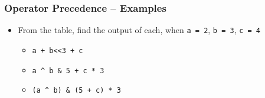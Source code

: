 \documentclass[11pt]{beamer}
\begin{document}
\begin{frame}[fragile]\frametitle{Operator Precedence -- Examples}
\label{sec-1-24}

\begin{itemize}
\item From the table, find the output of each, when \verb~a = 2~, \verb~b = 3~, \verb~c = 4~
\begin{itemize}
\item \verb~a + b<<3 + c~
\item \verb~a ^ b & 5 + c * 3~
\item \verb~(a ^ b) & (5 + c) * 3~
\end{itemize}
\end{itemize}
\end{frame}
\end{document}
